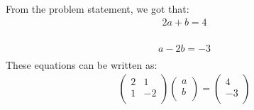 %      

From the problem statement, we got that:\\

\begin{equation}
\begin{aligned}
2a+b=4\\
\end{aligned}
\end{equation}

\begin{equation}
\begin{aligned}
a-2b=-3\\
\end{aligned}
\end{equation}
These equations can be written as:\\

\begin{equation}
\begin{aligned}
      \begin{pmatrix}
      2       & 1\\ 
      1       & -2\\
            
    \end{pmatrix} \begin{pmatrix}
      a\\ 
      b\\
            
    \end{pmatrix} = \begin{pmatrix}
      4\\ 
      -3\\
            
    \end{pmatrix} 
\end{aligned}
\end{equation}


